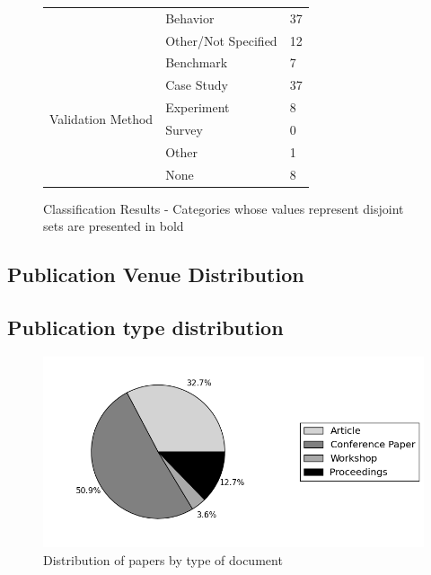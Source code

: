 \documentclass[letterpaper, 10 pt, conference]{ieeeconf}  %
\begin{document}
\begin{figure}
\begin{tabular}{ lll }
    & \multicolumn{1}{l}{Behavior}    & \multicolumn{1}{l}{37} \\
    & \multicolumn{1}{l}{Other/Not Specified}
                                       & \multicolumn{1}{l}{12} \\
    \hline
    \multirow{6}{*}{Validation Method}
    & \multicolumn{1}{l}{Benchmark}    & \multicolumn{1}{l}{7} \\
    & \multicolumn{1}{l}{Case Study}   & \multicolumn{1}{l}{37} \\
    & \multicolumn{1}{l}{Experiment}   & \multicolumn{1}{l}{8} \\
    & \multicolumn{1}{l}{Survey}       & \multicolumn{1}{l}{0} \\
    & \multicolumn{1}{l}{Other}        & \multicolumn{1}{l}{1} \\
    & \multicolumn{1}{l}{None}         & \multicolumn{1}{l}{8}
   \end{tabular}
   \caption{Classification Results - Categories whose values represent disjoint sets are presented in bold}

\end{figure}

\subsection{Publication Venue Distribution}

\subsection{Publication type distribution}
\begin{figure}
  \centering
  \includegraphics[scale=0.40]{doctype.png}
  \caption{Distribution of papers by type of document}
\end{figure}
\end{document}
